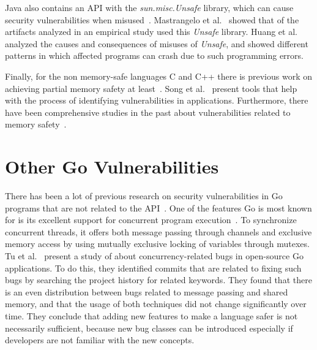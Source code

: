 Java also contains an \unsafe{} API with the \textit{sun.misc.Unsafe} library, which can cause security vulnerabilities
when misused~\cite{mastrangelo2019}.
Mastrangelo et al.~\cite{mastrangelo2015} showed that  of the artifacts analyzed in an empirical study
used this \textit{Unsafe} library.
Huang et al.~\cite{huang2019} analyzed the causes and consequences of misuses of \textit{Unsafe}, and showed different
patterns in which affected programs can crash due to such programming errors.

Finally, for the non memory-safe languages C and C++ there is previous work on achieving partial memory safety at
least~\cite{burow2018, nagarakatte2009}.
Song et al.~\cite{song2019} present tools that help with the process of identifying vulnerabilities in applications.
Furthermore, there have been comprehensive studies in the past about vulnerabilities related to memory
safety~\cite{szekeres2013,alnaeli2017,larochelle2001}.



\section{Other Go Vulnerabilities}\label{sec:related-work:other-go-vulnerabilities}

There has been a lot of previous research on security vulnerabilities in Go programs that are not related to the
\unsafe{} \acrshort{API}~\cite{zhou2017, hill2002, hannan1998, choi1999}.
One of the features Go is most known for is its excellent support for concurrent program execution~\cite{donovan2015}.
To synchronize concurrent threads, it offers both message passing through channels and exclusive memory access by using
mutually exclusive locking of variables through mutexes.
Tu et al.~\cite{tu2019} present a study of about  concurrency-related bugs in  open-source
Go applications.
To do this, they identified commits that are related to fixing such bugs by searching the project history for related
keywords.
They found that there is an even distribution between bugs related to message passing and shared memory, and that the
usage of both techniques did not change significantly over time.
They conclude that adding new features to make a language safer is not necessarily sufficient, because new bug classes
can be introduced especially if developers are not familiar with the new concepts.

